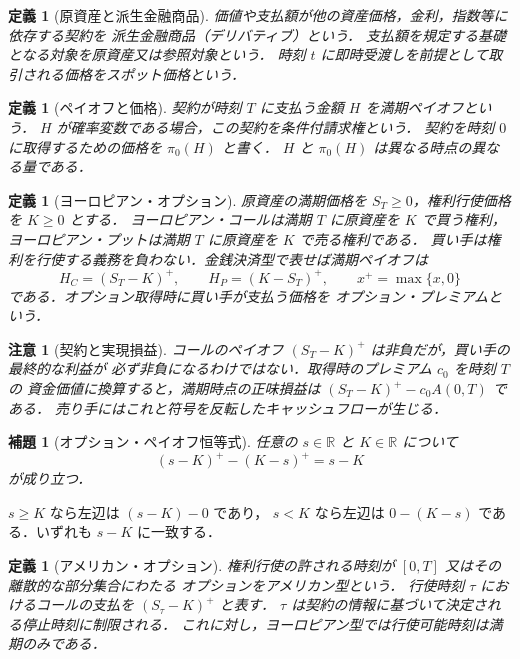 \documentclass[a5paper,10pt,onecolumn]{jsarticle}
\makeatletter
\theoremstyle{mathnotetheorem}
\newtheorem{definition}[theorem]{定義}
\newtheorem{lemma}[theorem]{補題}
\newtheorem{remark}[theorem]{注意}
\renewcommand{\proofname}{証明}
\renewenvironment{proof}[1][\proofname]{%
  \par\pushQED{\qed}\normalfont\topsep4\p@\@plus2\p@\relax
  \trivlist\item[\hskip\labelsep\bfseries #1]\ignorespaces
}{\popQED\endtrivlist\@endpefalse}
\newcommand{\R}{\mathbb{R}}
\makeatother
\begin{document}
\begin{definition}[原資産と派生金融商品]
価値や支払額が他の資産価格，金利，指数等に依存する契約を
\emph{派生金融商品}（デリバティブ）という．
支払額を規定する基礎となる対象を\emph{原資産}又は\emph{参照対象}という．
時刻 $t$ に即時受渡しを前提として取引される価格を\emph{スポット価格}という．
\end{definition}

\begin{definition}[ペイオフと価格]
契約が時刻 $T$ に支払う金額 $H$ を\emph{満期ペイオフ}という．
$H$ が確率変数である場合，この契約を\emph{条件付請求権}という．
契約を時刻 $0$ に取得するための価格を $\pi_0(H)$ と書く．
$H$ と $\pi_0(H)$ は異なる時点の異なる量である．
\end{definition}

\begin{definition}[ヨーロピアン・オプション]
原資産の満期価格を $S_T\ge0$，\emph{権利行使価格}を $K\ge0$ とする．
\emph{ヨーロピアン・コール}は満期 $T$ に原資産を $K$ で買う権利，
\emph{ヨーロピアン・プット}は満期 $T$ に原資産を $K$ で売る権利である．
買い手は権利を行使する義務を負わない．金銭決済型で表せば満期ペイオフは
\[
 H_C=(S_T-K)^+ ,\qquad H_P=(K-S_T)^+,
 \qquad x^+=\max\{x,0\}
\]
である．オプション取得時に買い手が支払う価格を
\emph{オプション・プレミアム}という．
\end{definition}

\begin{remark}[契約と実現損益]
コールのペイオフ $(S_T-K)^+$ は非負だが，買い手の最終的な利益が
必ず非負になるわけではない．取得時のプレミアム $c_0$ を時刻 $T$ の
資金価値に換算すると，満期時点の正味損益は
$(S_T-K)^+-c_0A(0,T)$ である．
売り手にはこれと符号を反転したキャッシュフローが生じる．
\end{remark}

\begin{lemma}[オプション・ペイオフ恒等式]\label{lem:payoff}
任意の $s\in\R$ と $K\in\R$ について
\[
 (s-K)^+-(K-s)^+=s-K
\]
が成り立つ．
\end{lemma}
\begin{proof}
$s\ge K$ なら左辺は $(s-K)-0$ であり，
$s<K$ なら左辺は $0-(K-s)$ である．いずれも $s-K$ に一致する．\end{proof}

\begin{definition}[アメリカン・オプション]
権利行使の許される時刻が $[0,T]$ 又はその離散的な部分集合にわたる
オプションを\emph{アメリカン型}という．
行使時刻 $\tau$ におけるコールの支払を $(S_\tau-K)^+$ と表す．
$\tau$ は契約の情報に基づいて決定される\emph{停止時刻}に制限される．
これに対し，ヨーロピアン型では行使可能時刻は満期のみである．
\end{definition}
\end{document}
